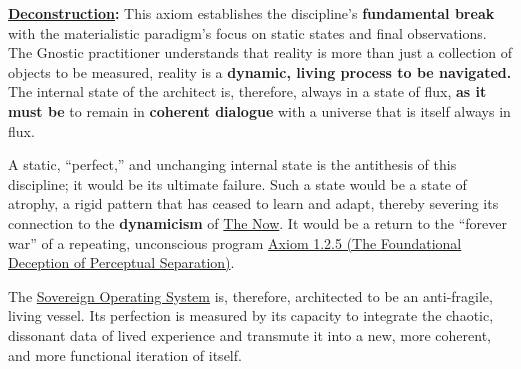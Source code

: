 \documentclass{article}
\begin{document}
\begin{nobullet}
    \item \textbf{\hyperlink{gloss:deconstruction}{Deconstruction}:} This axiom establishes the discipline's \textbf{fundamental break} with the materialistic paradigm's focus on static states and final observations. The Gnostic practitioner understands that reality is more than just a collection of objects to be measured, reality is a \textbf{dynamic, living process to be navigated.} The internal state of the architect is, therefore, always in a state of flux, \textbf{as it must be} to remain in \textbf{coherent dialogue} with a universe that is itself always in flux.

    A static, ``perfect,'' and unchanging internal state is the antithesis of this discipline; it would be its ultimate failure. Such a state would be a state of atrophy, a rigid pattern that has ceased to learn and adapt, thereby severing its connection to the \textbf{dynamicism} of \hyperlink{gloss:the_now}{The Now}. It would be a return to the ``forever war'' of a repeating, unconscious program \hyperref[axiom_1_2_5_the_foundational_deception_of_perceptual_separation]{Axiom 1.2.5 (The Foundational Deception of Perceptual Separation)}.

    The \hyperlink{gloss:sovereign_operating_system}{Sovereign Operating System} is, therefore, architected to be an anti-fragile, living vessel. Its perfection is measured by its capacity to integrate the chaotic, dissonant data of lived experience and transmute it into a new, more coherent, and more functional iteration of itself.


\end{nobullet}
\end{document}
